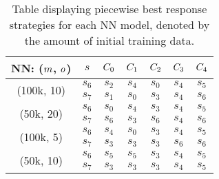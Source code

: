 \begin{table}[ht]
    \centering
    \begin{tabular}{c|c|ccccc}
        \textbf{NN: ($m$, $o$)} & $s$ & $C_0$ & $C_1$ & $C_2$ & $C_3$ & $C_4$ \\
        \hline
        \multirow{2}{*}{(100k, 10)} & $s_6$ & $s_2$ & $s_4$ & $s_0$ & $s_4$ & $s_5$ \\
                                     & $s_7$ & $s_1$ & $s_0$ & $s_3$ & $s_4$ & $s_6$ \\
        \hline
        \multirow{2}{*}{(50k, 20)}  & $s_6$ & $s_0$ & $s_4$ & $s_3$ & $s_4$ & $s_5$ \\
                                     & $s_7$ & $s_6$ & $s_3$ & $s_6$ & $s_4$ & $s_6$ \\
        \hline
        \multirow{2}{*}{(100k, 5)}  & $s_6$ & $s_4$ & $s_0$ & $s_3$ & $s_4$ & $s_5$ \\
                                     & $s_7$ & $s_3$ & $s_3$ & $s_3$ & $s_6$ & $s_6$ \\
        \hline
        \multirow{2}{*}{(50k, 10)}  & $s_6$ & $s_5$ & $s_5$ & $s_3$ & $s_4$ & $s_5$ \\
                                     & $s_7$ & $s_3$ & $s_3$ & $s_3$ & $s_4$ & $s_5$ \\
    \end{tabular}
    \caption{Table displaying piecewise best response strategies for each NN model, denoted by the amount of initial training data.}
    \label{table:game2_pwbr_strategy_spec}
\end{table}